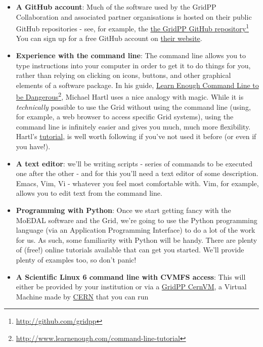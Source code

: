 \begin{itemize}
\tightlist
\item
  \textbf{A GitHub account}: Much of
  the software used by the GridPP Collaboration
  and associated partner organisations is hosted on their
  public GitHub repositories - see, for example, the
  \href{http://github.com/gridpp}{the GridPP GitHub repository}\footnote{
\href{http://github.com/gridpp}{http://github.com/gridpp}
} You can sign up for a free GitHub account on \href{http://github.com}{their
  website}.
\item
  \textbf{Experience with the command line}: The command line allows you
  to type instructions into your computer in order to get it to do
  things for you, rather than relying on clicking on icons, buttons, and
  other graphical elements of a software package. In his guide,
  \href{http://www.learnenough.com/command-line-tutorial}{Learn Enough
  Command Line to be Dangerous}\footnote{
\href{http://www.learnenough.com/command-line-tutorial}{http://www.learnenough.com/command-line-tutorial}
}, Michael Hartl uses a nice analogy with
  magic. While it is \emph{technically} possible to use the Grid without
  using the command line (using, for example, a web browser to access
  specific Grid systems), using the command line is infinitely easier
  and gives you much, much more flexibility. Hartl's
  \href{http://www.learnenough.com/command-line-tutorial}{tutorial}, is
  well worth following if you've not used it before (or even if you
  have!).
\item
  \textbf{A text editor}: we'll be writing scripts - series of commands
  to be executed one after the other - and for this you'll need a text
  editor of some description. Emacs, Vim, Vi - whatever you feel most
  comfortable with. Vim, for example, allows you to edit text from the
  command line.
\item
  \textbf{Programming with Python}: Once we start getting fancy with the
  \ac{MoEDAL} software and the
  Grid, we're going to use the Python programming language (via an
  Application Programming Interface) to do a lot of the work for us. As
  such, some familiarity with Python will be handy. There are plenty of
  (free!) online tutorials available that can get you started. We'll
  provide plenty of examples too, so don't panic!
\item
  \textbf{A Scientific Linux 6 command line with CVMFS access}: This
  will either be provided by your institution or
  via a \href{../gridpp-cernvm/gridpp-cernvm.html}{GridPP CernVM}, a
  Virtual Machine made by \href{http://cern.home}{CERN} that you can run

\end{itemize}
